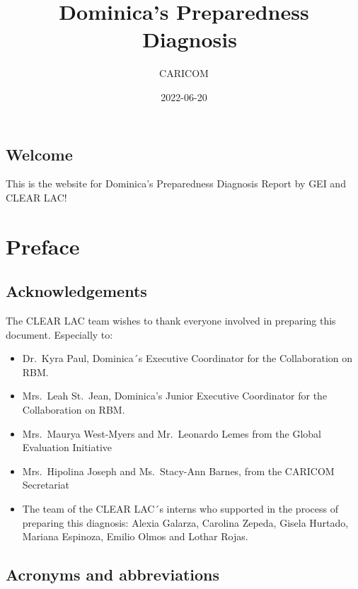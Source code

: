 \documentclass[
  10pt,
]{book}
\title{Dominica's Preparedness ~Diagnosis}
\author{CARICOM}
\date{2022-06-20}
\begin{document}
\maketitle

{
\setcounter{tocdepth}{1}
\tableofcontents
}
\hypertarget{welcome}{%
\chapter*{Welcome}\label{welcome}}

This is the website for Dominica's Preparedness Diagnosis Report by GEI and CLEAR LAC!

\hypertarget{part-preface}{%
\part{Preface}\label{part-preface}}

\hypertarget{acknowledgements}{%
\chapter*{Acknowledgements}\label{acknowledgements}}

The CLEAR LAC team wishes to thank everyone involved in preparing this document. Especially to:

\begin{itemize}
\item
  Dr.~Kyra Paul, Dominica´s Executive Coordinator for the Collaboration on RBM.
\item
  Mrs.~Leah St.~Jean, Dominica's Junior Executive Coordinator for the Collaboration on RBM.
\item
  Mrs.~Maurya West-Myers and Mr.~Leonardo Lemes from the Global Evaluation Initiative
\item
  Mrs.~Hipolina Joseph and Ms.~Stacy-Ann Barnes, from the CARICOM Secretariat
\item
  The team of the CLEAR LAC´s interns who supported in the process of preparing this diagnosis: Alexia Galarza, Carolina Zepeda, Gisela Hurtado, Mariana Espinoza, Emilio Olmos and Lothar Rojas.
\end{itemize}

\hypertarget{acronyms-and-abbreviations}{%
\chapter*{Acronyms and abbreviations}\label{acronyms-and-abbreviations}}
\end{document}
